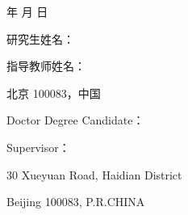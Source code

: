 {\begin{titlepage}
\begin{center}
            \ThesisYear 年 \ThesisMonth 月 \ThesisDay 日

        \end{center}
    \end{titlepage}
    \newpage

    \pagestyle{empty}
    \begin{titlepage}
        \begin{center}
            \qquad
            \vspace{10mm}

            \ThesisTitleCN \par     %
            \vspace{10mm}

            \vspace{20mm}

            \ThesisTitleEN \par     %
            \vspace{10mm}

            \vspace{40mm}

            研究生姓名：\AuthorCN \par
            \vspace{3mm}
            指导教师姓名：\TeacherCN \par
            \vspace{3mm}
            \UniversityCN \SchoolCN \par
            \vspace{3mm}
            北京 100083，中国 \par
            \vspace{8mm}

            Doctor Degree Candidate：\AuthorEN \par
            \vspace{3mm}
            Supervisor：\TeacherEN \par
            \vspace{3mm}
            \SchoolEN \par
            \vspace{3mm}
            \UniversityEN \par
            \vspace{3mm}
            30 Xueyuan Road, Haidian District \par
            \vspace{3mm}
            Beijing 100083, P.R.CHINA


\end{center}
\end{titlepage}}
